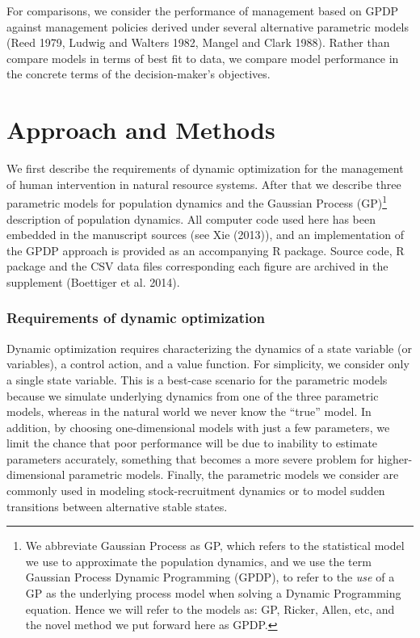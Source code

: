 \documentclass[author-year, 12pt,review]{components/elsarticle} %
\begin{document}
For comparisons, we consider the performance of management based on GPDP
against management policies derived under several alternative parametric
models (Reed 1979, Ludwig and Walters 1982, Mangel and Clark 1988).
Rather than compare models in terms of best fit to data, we compare
model performance in the concrete terms of the decision-maker's
objectives.

\section{Approach and Methods}\label{approach-and-methods}

We first describe the requirements of dynamic optimization for the
management of human intervention in natural resource systems. After that
we describe three parametric models for population dynamics and the
Gaussian Process (GP)\footnote{We abbreviate Gaussian Process as GP,
  which refers to the statistical model we use to approximate the
  population dynamics, and we use the term Gaussian Process Dynamic
  Programming (GPDP), to refer to the \emph{use} of a GP as the
  underlying process model when solving a Dynamic Programming equation.
  Hence we will refer to the models as: GP, Ricker, Allen, etc, and the
  novel method we put forward here as GPDP.} description of population
dynamics. All computer code used here has been embedded in the
manuscript sources (see Xie (2013)), and an implementation of the GPDP
approach is provided as an accompanying R package. Source code, R
package and the CSV data files corresponding each figure are archived in
the supplement (Boettiger et al. 2014).

\subsubsection{Requirements of dynamic
optimization}\label{requirements-of-dynamic-optimization}

Dynamic optimization requires characterizing the dynamics of a state
variable (or variables), a control action, and a value function. For
simplicity, we consider only a single state variable. This is a
best-case scenario for the parametric models because we simulate
underlying dynamics from one of the three parametric models, whereas in
the natural world we never know the ``true'' model. In addition, by
choosing one-dimensional models with just a few parameters, we limit the
chance that poor performance will be due to inability to estimate
parameters accurately, something that becomes a more severe problem for
higher-dimensional parametric models. Finally, the parametric models we
consider are commonly used in modeling stock-recruitment dynamics or to
model sudden transitions between alternative stable states.
\end{document}
